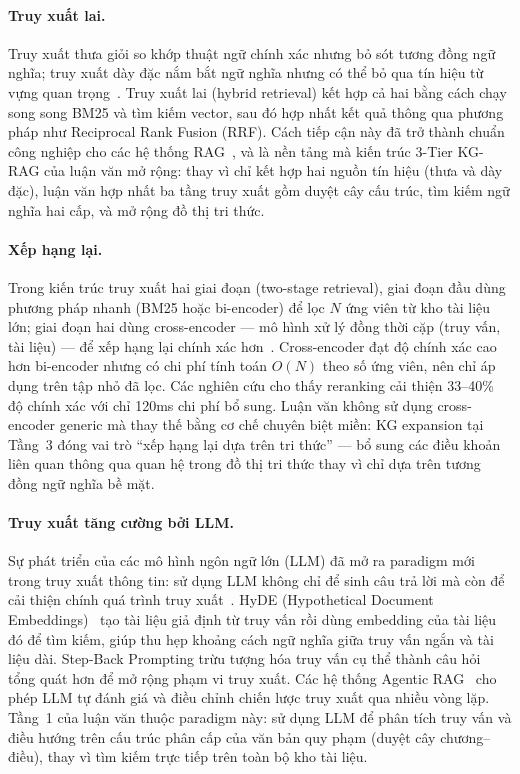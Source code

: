 \paragraph{Truy xuất lai.}
\label{subsec:truy-xuat-lai}
Truy xuất thưa giỏi so khớp thuật ngữ chính xác nhưng bỏ sót tương đồng ngữ nghĩa;
truy xuất dày đặc nắm bắt ngữ nghĩa nhưng có thể bỏ qua tín hiệu từ vựng quan
trọng~\cite{fan2024ragsurvey}. Truy xuất lai (hybrid retrieval) kết hợp cả hai
bằng cách chạy song song BM25 và tìm kiếm vector, sau đó hợp nhất kết quả thông qua
phương pháp như Reciprocal Rank Fusion (RRF). Cách tiếp cận này đã trở thành chuẩn
công nghiệp cho các hệ thống RAG~\cite{fan2024ragsurvey}, và là nền tảng mà kiến
trúc 3-Tier KG-RAG của luận văn mở rộng: thay vì chỉ kết hợp hai nguồn tín hiệu
(thưa và dày đặc), luận văn hợp nhất ba tầng truy xuất gồm duyệt cây cấu trúc,
tìm kiếm ngữ nghĩa hai cấp, và mở rộng đồ thị tri thức.

\paragraph{Xếp hạng lại.}
\label{subsec:xep-hang-lai}
Trong kiến trúc truy xuất hai giai đoạn (two-stage retrieval), giai đoạn đầu dùng
phương pháp nhanh (BM25 hoặc bi-encoder) để lọc $N$ ứng viên từ kho tài liệu lớn;
giai đoạn hai dùng cross-encoder --- mô hình xử lý đồng thời cặp (truy vấn, tài liệu)
--- để xếp hạng lại chính xác hơn~\cite{nogueira2020reranking}. Cross-encoder đạt
độ chính xác cao hơn bi-encoder nhưng có chi phí tính toán $O(N)$ theo số ứng viên,
nên chỉ áp dụng trên tập nhỏ đã lọc. Các nghiên cứu cho thấy reranking cải thiện
33--40\% độ chính xác với chỉ 120ms chi phí bổ sung. Luận văn không sử dụng
cross-encoder generic mà thay thế bằng cơ chế chuyên biệt miền: KG expansion tại
Tầng~3 đóng vai trò ``xếp hạng lại dựa trên tri thức'' --- bổ sung các điều khoản
liên quan thông qua quan hệ trong đồ thị tri thức thay vì chỉ dựa trên tương đồng
ngữ nghĩa bề mặt.

\paragraph{Truy xuất tăng cường bởi LLM.}
\label{subsec:truy-xuat-llm}
Sự phát triển của các mô hình ngôn ngữ lớn (LLM) đã mở ra paradigm mới trong truy
xuất thông tin: sử dụng LLM không chỉ để sinh câu trả lời mà còn để cải thiện chính
quá trình truy xuất~\cite{zhu2024llmir}. HyDE (Hypothetical Document Embeddings)~\cite{gao2023hyde}
tạo tài liệu giả định từ truy vấn rồi dùng embedding của tài liệu đó để tìm kiếm, giúp
thu hẹp khoảng cách ngữ nghĩa giữa truy vấn ngắn và tài liệu dài. Step-Back
Prompting trừu tượng hóa truy vấn cụ thể thành câu hỏi tổng quát hơn để mở rộng
phạm vi truy xuất. Các hệ thống Agentic RAG~\cite{asai2024selfrag} cho phép LLM
tự đánh giá và điều chỉnh chiến lược truy xuất qua nhiều vòng lặp. Tầng~1 của luận
văn thuộc paradigm này: sử dụng LLM để phân tích truy vấn và điều hướng trên cấu
trúc phân cấp của văn bản quy phạm (duyệt cây chương--điều), thay vì tìm kiếm
trực tiếp trên toàn bộ kho tài liệu.

